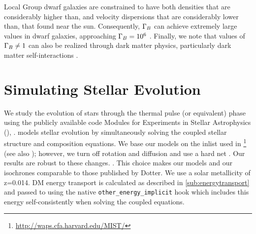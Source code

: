 \documentclass[useAMS,usenatbib]{mnras}
\begin{document}
  Local Group dwarf galaxies are constrained to have both densities that are considerably higher than, and velocity dispersions that are considerably lower than, that found near the sun. Consequently, $\Gamma_B$ can achieve extremely large values in dwarf galaxies, approaching $\Gamma_B = 10^{6}$
  .
  Finally, we note that values of $\Gamma_B \ne 1$ can also be realized through dark matter physics, particularly dark matter self-interactions \citep{Zentner2009High-energySun}.


\section{Simulating Stellar Evolution}
\label{sec:methods}

  We study the evolution of \mrange stars through the thermal pulse (or equivalent) phase using the publicly available code Modules for Experiments in Stellar Astrophysics (\mesa), \citep{Paxton2011ModulesMESA}. \mesa models stellar evolution by simultaneously solving the coupled stellar structure and composition equations. We base our models on the \mesa inlist used in \citet{Choi2016mesaModels}\footnote{\url{http://waps.cfa.harvard.edu/MIST/}} (see also \citealt{Dotter2016MesaIsochrones}); however, we turn off rotation and diffusion and use a hard net .  Our results are robust to these changes. . This choice makes our models and our isochrones comparable to those published by Dotter. We use a solar metallicity of z=0.014. DM energy transport is calculated as described in \ref{sub:energytransport} and passed to \mesa using the native \texttt{other\_energy\_implicit} hook which includes this energy self-consistently when solving the coupled equations.
\end{document}
